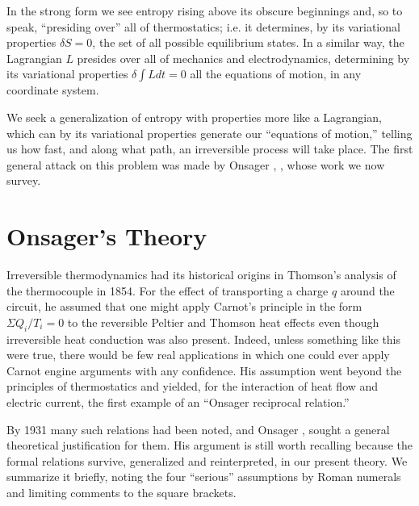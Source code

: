\documentclass{article}
\begin{document}
In the strong form we see entropy rising above its obscure beginnings and, so to speak, ``presiding over'' all of thermostatics; i.e. it determines, by its variational properties $\delta S=0$, the set of all possible equilibrium states. In a similar way, the Lagrangian $L$ presides over all of mechanics and electrodynamics, determining by its variational properties $\delta \int L d t=0$ all the equations of motion, in any coordinate system.

We seek a generalization of entropy with properties more like a Lagrangian, which can by its variational properties generate our ``equations of motion,'' telling us how fast, and along what path, an irreversible process will take place. The first general attack on this problem was made by Onsager \cite{onsager1931a}, \cite{onsager1931b}, whose work we now survey.

\section{Onsager's Theory}

Irreversible thermodynamics had its historical origins in Thomson's analysis of the thermocouple in 1854. For the effect of transporting a charge $q$ around the circuit, he assumed that one might apply Carnot's principle in the form $\Sigma Q_i / T_i=0$ to the reversible Peltier and Thomson heat effects even though irreversible heat conduction was also present. Indeed, unless something like this were true, there would be few real applications in which one could ever apply Carnot engine arguments with any confidence. His assumption went beyond the principles of thermostatics and yielded, for the interaction of heat flow and electric current, the first example of an ``Onsager reciprocal relation.''

By 1931 many such relations had been noted, and Onsager \cite{onsager1931a}, \cite{onsager1931b} sought a general theoretical justification for them. His argument is still worth recalling because the formal relations survive, generalized and reinterpreted, in our present theory. We summarize it briefly, noting the four ``serious'' assumptions by Roman numerals and limiting comments to the square brackets.
\end{document}
